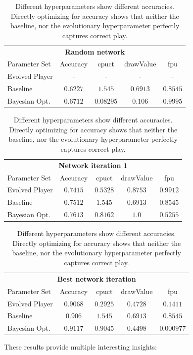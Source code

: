 \documentclass[12pt,onecolumn,oneside,titlepage]{article}
\begin{document}
\begin{table} [H]
 \centering

  \begin{tabular}{ l  c c c c }
  \multicolumn{5}{c}{\textbf{Random network}} \\
  Parameter Set & Accuracy & cpuct & drawValue & fpu \\
  \hline
  Evolved Player & - & - & - & - \\
  Baseline & $0.6227$ & $1.545$ & $0.6913$ & $0.8545$ \\
  Bayesian Opt. & $0.6712$ & $0.08295$ & $0.106$ & $0.9995$ \\
  \end{tabular}
 
 \begin{tabular}{ l c c c c }
 \\
  \multicolumn{5}{c}{\textbf{Network iteration 1}} \\
  Parameter Set & Accuracy & cpuct & drawValue & fpu \\
  \hline
  Evolved Player & $0.7415$ & $0.5328$ & $0.8753$ & $0.9912$ \\
  Baseline & $0.7512$ & $1.545$ & $0.6913$ & $0.8545$ \\
  Bayesian Opt. & $0.7613$ & $0.8162$ & $1.0$ & $0.5255$ \\
  \end{tabular}
  
 \begin{tabular}{ l c c c c }
 \\
  \multicolumn{5}{c}{\textbf{Best network iteration}} \\
  Parameter Set & Accuracy & cpuct & drawValue & fpu \\
  \hline
  Evolved Player & $0.9068$ & $0.2925$ & $0.4728$ & $0.1411$ \\
  Baseline & $0.906$ & $1.545$ & $0.6913$ & $0.8545$ \\
  Bayesian Opt. & $0.9117$ & $0.9045$ & $0.4498$ & $0.000977$ \\
  \end{tabular}
  
  \caption{Different hyperparameters show different accuracies. Directly optimizing for accuracy shows that neither the baseline, nor the evolutionary hyperparameter perfectly captures correct play.}
  \label{t:hyperparam_accuracy}
\end{table}

These results provide multiple interesting insights:
\end{document}
